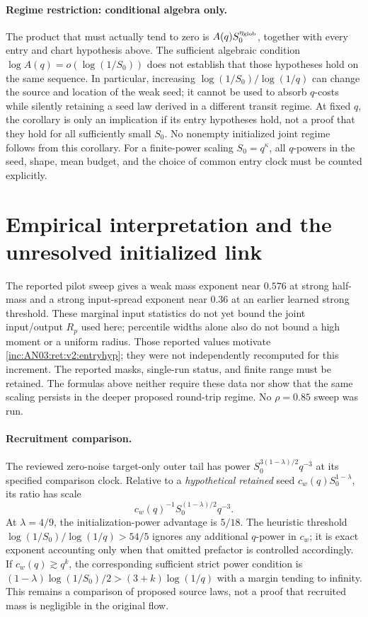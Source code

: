 \documentclass[11pt]{article}
\numberwithin{equation}{section}
\theoremstyle{remark}\newtheorem{remark}[theorem]{Remark}
\newcommand{\1}{\mathbf 1}
\begin{document}
\paragraph{Regime restriction: conditional algebra only.}
The product that must actually tend to zero is
$A(q)S_0^{\eta_{\rm glob}}$, together with every entry and chart
hypothesis above. The sufficient algebraic condition
$\log A(q)=o(\log(1/S_0))$ does not establish that those hypotheses
hold on the same sequence. In particular, increasing
$\log(1/S_0)/\log(1/q)$ can change the source and location of the weak
seed; it cannot be used to absorb $q$-costs while silently retaining a
seed law derived in a different transit regime. At fixed $q$, the corollary
is only an implication if its entry hypotheses hold, not a proof that they
hold for all sufficiently small $S_0$. No nonempty initialized joint
regime follows from this corollary. For a finite-power scaling
$S_0=q^\kappa$, all $q$-powers in the seed, shape, mean budget, and the
choice of common entry clock must be counted explicitly.

\section{Empirical interpretation and the unresolved initialized link}
\label{inc:AN03:ret:v2:status}
The reported pilot sweep gives a weak mass exponent near $0.576$ at
strong half-mass and a strong input-spread exponent near $0.36$ at an
earlier learned strong threshold. These marginal input statistics do not
yet bound the joint input/output $R_p$ used here; percentile widths alone
also do not bound a high moment or a uniform radius. Those reported values motivate
\eqref{inc:AN03:ret:v2:entryhyp}; they were not independently recomputed
for this increment. The reported masks, single-run status, and finite
range must be retained. The formulas above neither require these data
nor show that the same scaling persists in the deeper proposed round-trip
regime. No $\rho=0.85$ sweep was run.

\paragraph{Recruitment comparison.}
The reviewed zero-noise target-only outer tail has power
$S_0^{3(1-\lambda)/2}q^{-3}$ at its specified comparison clock.
Relative to a \emph{hypothetical retained} seed $c_w(q)S_0^{1-\lambda}$,
its ratio has scale
\[
 c_w(q)^{-1}S_0^{(1-\lambda)/2}q^{-3}.
\]
At $\lambda=4/9$, the initialization-power advantage is $5/18$.
The heuristic threshold $\log(1/S_0)/\log(1/q)>54/5$ ignores any
additional $q$-power in $c_w$; it is exact exponent accounting only when
that omitted prefactor is controlled accordingly. If
$c_w(q)\gtrsim q^k$, the corresponding sufficient strict power condition
is $(1-\lambda)\log(1/S_0)/2>(3+k)\log(1/q)$ with a margin tending
to infinity. This remains a comparison of proposed source laws, not a
proof that recruited mass is negligible in the original flow.
\end{document}
